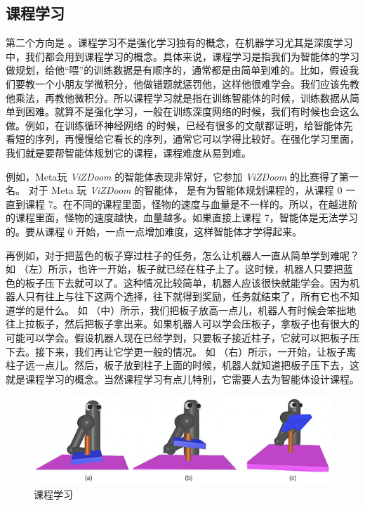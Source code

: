 \subsection{课程学习} 

第二个方向是 。课程学习不是强化学习独有的概念，在机器学习尤其是深度学习中，我们都会用到课程学习的概念。具体来说，课程学习是指我们为智能体的学习做规划，给他“喂”的训练数据是有顺序的，通常都是由简单到难的。比如，假设我们要教一个小朋友学微积分，他做错题就惩罚他，这样他很难学会。我们应该先教他乘法，再教他微积分。所以课程学习就是指在训练智能体的时候，训练数据从简单到困难。就算不是强化学习，一般在训练深度网络的时候，我们有时候也会这么做。例如，在训练循环神经网络 的时候，已经有很多的文献都证明，给智能体先看短的序列，再慢慢给它看长的序列，通常它可以学得比较好。在强化学习里面，我们就是要帮智能体规划它的课程，课程难度从易到难。

例如，Meta玩 \textit{ViZDoom} 的智能体表现非常好，它参加 \textit{ViZDoom} 的比赛得了第一名。
对于 Meta 玩 \textit{ViZDoom} 的智能体，
是有为智能体规划课程的，从课程 0 一直到课程 7。在不同的课程里面，怪物的速度与血量是不一样的。所以，在越进阶的课程里面，怪物的速度越快，血量越多。如果直接上课程 7，智能体是无法学习的。要从课程 0 开始，一点一点增加难度，这样智能体才学得起来。

再例如，对于把蓝色的板子穿过柱子的任务，怎么让机器人一直从简单学到难呢？
如 （左）所示，也许一开始，板子就已经在柱子上了。这时候，机器人只要把蓝色的板子压下去就可以了。这种情况比较简单，机器人应该很快就能学会。因为机器人只有往上与往下这两个选择，往下就得到奖励，任务就结束了，所有它也不知道学的是什么。
如 （中）所示，我们把板子放高一点儿，机器人有时候会笨拙地往上拉板子，然后把板子拿出来。如果机器人可以学会压板子，拿板子也有很大的可能可以学会。假设机器人现在已经学到，只要板子接近柱子，它就可以把板子压下去。接下来，我们再让它学更一般的情况。
如 （右）所示，一开始，让板子离柱子远一点儿。然后，板子放到柱子上面的时候，机器人就知道把板子压下去，这就是课程学习的概念。当然课程学习有点儿特别，它需要人去为智能体设计课程。

\begin{figure}[htb]
    \centering
    \includegraphics[width=0.5\linewidth]{res/ch10/10.6}
    \caption{课程学习}
    \label{fig:fig10.6}
\end{figure}

